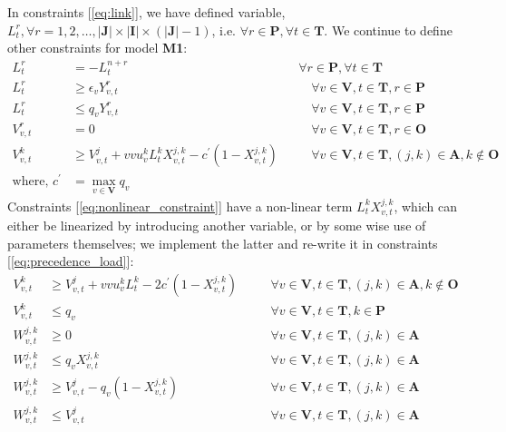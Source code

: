 \documentclass[12pt,a4paper]{article}
\begin{document}
In constraints [\ref{eq:link}], we have defined variable, $L_{t}^{r}, \forall r=1,2,\ldots,|\textbf{J}|\times|\textbf{I}|\times(|\textbf{J}|-1)$, i.e. $\forall r \in \textbf{P}, \forall t \in \textbf{T}$. We continue to define other constraints for model \textbf{M1}:
\begin{align}
L_{t}^{r} & = -L_{t}^{n+r} && \forall r \in \textbf{P}, \forall t \in \textbf{T} \label{eq:Fig3_2} \\
L_{t}^{r} & \geq \epsilon_v Y_{v,t}^{r} && \quad \forall v \in \textbf{V}, t \in \textbf{T}, r \in \textbf{P} \\
L_{t}^{r} & \leq q_v Y_{v,t}^{r} && \quad \forall v \in \textbf{V}, t \in \textbf{T}, r \in \textbf{P} \\
V_{v,t}^{r} & = 0 && \quad \forall v \in \textbf{V}, t \in \textbf{T}, r \in \textbf{O} \\
V_{v,t}^{k} & \geq V_{v,t}^{j}+vvu_{v}^{k} L_{t}^{k} X_{v,t}^{j,k}-c^{'} (1-X_{v,t}^{j,k}) && \quad \forall v \in \textbf{V}, t \in \textbf{T}, (j,k) \in \textbf{A}, k \not \in \textbf{O} \label{eq:nonlinear_constraint} \\
\text{where, } c^{'} & = \max_{v \in \textbf{V}} q_v \nonumber
\end{align}
Constraints [\ref{eq:nonlinear_constraint}] have a non-linear term $L_{t}^{k} X_{v,t}^{j,k}$, which can either be linearized by introducing another variable, or by some wise use of parameters themselves; we implement the latter and re-write it in constraints [\ref{eq:precedence_load}]:
\begin{align}
V_{v,t}^{k} & \geq V_{v,t}^{j}+vvu_{v}^{k} L_{t}^{k} -2c^{'} (1-X_{v,t}^{j,k}) && \quad \forall v \in \textbf{V}, t \in \textbf{T}, (j,k) \in \textbf{A}, k \not \in \textbf{O} \label{eq:precedence_load} \\
V_{v,t}^{k} & \leq q_v && \quad \forall v \in \textbf{V}, t \in \textbf{T}, k \in \textbf{P} \\
W_{v,t}^{j,k} & \geq 0 && \quad \forall v \in \textbf{V}, t \in \textbf{T}, (j,k) \in \textbf{A} \\
W_{v,t}^{j,k} & \leq q_v X_{v,t}^{j,k} && \quad \forall v \in \textbf{V}, t \in \textbf{T}, (j,k) \in \textbf{A} \\
W_{v,t}^{j,k} & \geq V_{v,t}^{j} -q_v (1-X_{v,t}^{j,k}) && \quad \forall v \in \textbf{V}, t \in \textbf{T}, (j,k) \in \textbf{A} \\
W_{v,t}^{j,k} & \leq V_{v,t}^{j} && \quad \forall v \in \textbf{V}, t \in \textbf{T}, (j,k) \in \textbf{A}
\end{align}
\end{document}
